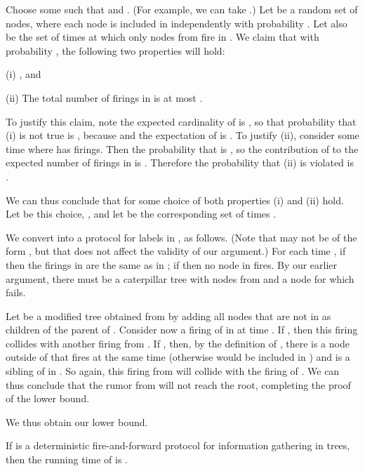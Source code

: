 Choose some  such that  and
. (For example, we can take .)
Let  be a random set of nodes, where each node 
is included in  independently with probability .  
Let also  be the set of times at which only nodes from  fire in . 
We claim that with probability , the following two 
properties will hold:
\begin{description}
\item{(i)} , and
\item{(ii)} The total number of firings in  is at most .
\end{description}
To justify this claim, note the expected cardinality of  is ,
so that probability that (i) is not true is
, because  and the expectation of 
 is .
To justify (ii), consider some time  where  has  firings.
Then the probability that  is  , so
the contribution of  to the expected number of firings in  is .
Therefore the probability that (ii) is violated is .

We can thus conclude that for some choice of  both properties (i) and (ii)
hold. Let  be this choice, , and let  be the corresponding
set of times .

We convert  into a protocol  for labels in , as follows.
(Note that  may not be of the form , but that does not affect the validity of our argument.)
For each time , if  then the firings in  are the same as in ;
if  then no node in  fires.
By our earlier argument, there must be a caterpillar tree  with nodes from  and a node 
for which  fails. 

Let  be a modified tree obtained from  by adding all nodes that are not in 
as children of the parent of .
Consider now a firing of  in  at time .
If , then this firing  collides with another firing from . 
If , then, by the definition of , there is a node  outside of 
that fires at the same time (otherwise  would be included in ) and is a sibling
of  in . So again, this firing from  will collide with the firing of .
We can thus conclude that the rumor from  will not reach the root, completing the proof of
the lower bound.

We thus obtain our lower bound.



\begin{theorem} \label{thm: fireandforward lower bound}
If  is a deterministic fire-and-forward protocol for information gathering
in trees, then the running time of  is .
\end{theorem}
